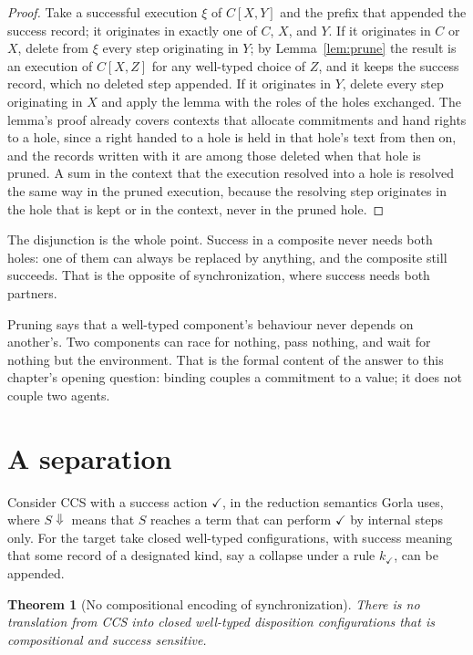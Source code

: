 \documentclass[11pt,openany]{book}
\newtheorem{theorem}{Theorem}[chapter]
\theoremstyle{remark}
\begin{document}
\begin{proof}
Take a successful execution $\xi$ of $C[X,Y]$ and the prefix that
appended the success record; it originates in exactly one of $C$, $X$,
and $Y$. If it originates in $C$ or $X$, delete from $\xi$ every step
originating in $Y$; by Lemma~\ref{lem:prune} the result is an execution of
$C[X,Z]$ for any well-typed choice of $Z$, and it keeps the success
record, which no deleted step appended. If it originates in $Y$, delete
every step originating in $X$ and apply the lemma with the roles of the
holes exchanged. The lemma's proof already covers contexts that allocate
commitments and hand rights to a hole, since a right handed to a hole is
held in that hole's text from then on, and the records written with it
are among those deleted when that hole is pruned. A sum in the context
that the execution resolved into a hole is resolved the same way in the
pruned execution, because the resolving step originates in the hole that
is kept or in the context, never in the pruned hole.
\end{proof}

The disjunction is the whole point. Success in a composite never needs
both holes: one of them can always be replaced by anything, and the
composite still succeeds. That is the opposite of synchronization, where
success needs both partners.

Pruning says that a well-typed component's behaviour never depends on
another's. Two components can race for nothing, pass nothing, and wait
for nothing but the environment. That is the formal content of the answer
to this chapter's opening question: binding couples a commitment to a
value; it does not couple two agents.

\section{A separation}

Consider CCS with a success action $\checkmark$, in the reduction semantics
Gorla uses, where $S\Downarrow$ means that $S$ reaches a term that can
perform $\checkmark$ by internal steps only. For the target take closed
well-typed configurations, with success meaning that some record of a
designated kind, say a collapse under a rule $k_\checkmark$, can be
appended.

\begin{theorem}[No compositional encoding of synchronization]\label{thm:ccssep}
There is no translation from CCS into closed well-typed disposition
configurations that is compositional and success sensitive.
\end{theorem}
\end{document}
